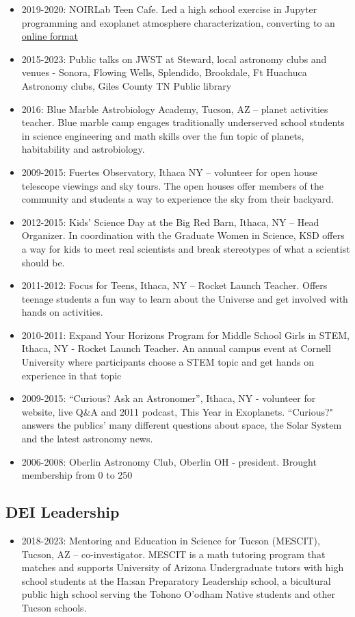\documentclass[11pt, oneside]{article}   	%
\begin{document}
\begin{itemize}[noitemsep]
    \item 2019-2020: NOIRLab Teen Cafe. Led a high school exercise in Jupyter programming and exoplanet atmosphere characterization, converting to an \href{https://eas342.github.io/interactive_lc/exoplanet_spectra_cafe.html}{online format}
    \item 2015-2023: Public talks on JWST at Steward, local astronomy clubs and venues - Sonora, Flowing Wells, Splendido, Brookdale, Ft Huachuca Astronomy clubs, Giles County TN Public library
    \item 2016: Blue Marble Astrobiology Academy, Tucson, AZ -- planet activities teacher. Blue marble camp engages traditionally underserved school students in science engineering and math skills over the fun topic of planets, habitability and astrobiology.
    \item 2009-2015: Fuertes Observatory, Ithaca NY -- volunteer for open house telescope viewings and sky tours. The open houses offer members of the community and students a way to experience the sky from their backyard.
    \item 2012-2015: Kids' Science Day at the Big Red Barn, Ithaca, NY -- Head Organizer. In coordination with the Graduate Women in Science, KSD offers a way for kids to meet real scientists and break stereotypes of what a scientist should be.
    \item 2011-2012: Focus for Teens, Ithaca, NY -- Rocket Launch Teacher. Offers teenage students a fun way to learn about the Universe and get involved with hands on activities.
    \item 2010-2011: Expand Your Horizons Program for Middle School Girls in STEM, Ithaca, NY - Rocket Launch Teacher. An annual campus event at Cornell University where participants choose a STEM topic and get hands on experience in that topic
    \item 2009-2015: ``Curious? Ask an Astronomer'', Ithaca, NY - volunteer for website, live Q\&A and 2011 podcast, This Year in Exoplanets. ``Curious?" answers the publics' many different questions about space, the Solar System and the latest astronomy news.
    \item 2006-2008: Oberlin Astronomy Club, Oberlin OH - president. Brought membership from 0 to 250
 \end{itemize}

\subsection*{DEI Leadership}
\begin{itemize}[noitemsep]
    \item 2018-2023: Mentoring and Education in Science for Tucson (MESCIT), Tucson, AZ -- co-investigator. MESCIT is a math tutoring program that matches and supports University of Arizona Undergraduate tutors with high school students at the Ha:san Preparatory Leadership school, a bicultural public high school serving the Tohono O'odham Native students and other Tucson schools.
\end{itemize}
\end{document}
